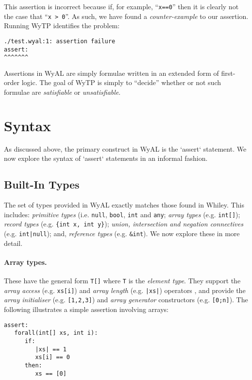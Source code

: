 This assertion is incorrect because if, for example,
``\lstinline{x==0}'' then it is clearly not the case that
``\lstinline{x > 0}''.  As such, we have found a {\em counter-example}
to our assertion.  Running WyTP identifies the problem:
\begin{lstlisting}
./test.wyal:1: assertion failure
assert:
^^^^^^^
\end{lstlisting}

Assertions in WyAL are simply formulae written in an extended form of
first-order logic.  The goal of WyTP is simply to ``decide'' whether
or not such formulae are {\em satisfiable} or {\em unsatisfiable}.  


\section{Syntax}
As discussed above, the primary construct in WyAL is the `assert`
statement.  We now explore the syntax of `assert` statements in an
informal fashion.


\subsection{Built-In Types}

The set of types provided in WyAL exactly matches those found in
Whiley.  This includes: {\em primitive types} (i.e. \lstinline{null},
\lstinline{bool}, \lstinline{int} and \lstinline{any}; {\em array
    types} (e.g. \lstinline{int[]}); {\em record types}
  (e.g. \lstinline|{int x, int y}|); {\em union, intersection and
    negation connectives} (e.g. \lstinline{int|null}); and,
  {\em reference types} (e.g. \lstinline{&int}).  We now explore these
  in more detail.

  \paragraph{Array types.} These have the general form \lstinline{T[]}
  where \lstinline{T} is the {\em element type}.  They support the
  {\em array access} (e.g. \lstinline{xs[i]}) and {\em array length}
  (e.g. \lstinline{|xs|}) operators , and provide the {\em array
    initialiser} (e.g. \lstinline{[1,2,3]}) and {\em array generator}
  constructors (e.g. \lstinline{[0;n]}).  The following illustrates a
  simple assertion involving arrays:

\begin{lstlisting}[language=WyAL]
assert:
   forall(int[] xs, int i):
      if:
         |xs| == 1
         xs[i] == 0
      then:
         xs == [0]
\end{lstlisting}


